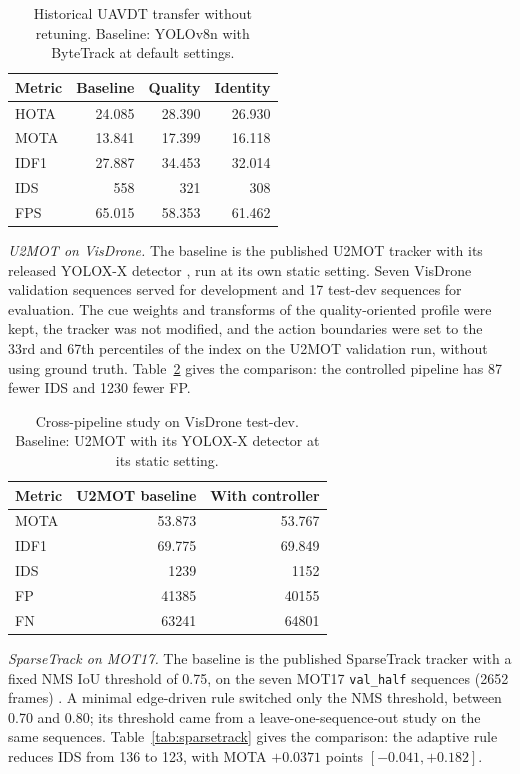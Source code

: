 \begin{table}[t]
\caption{Historical UAVDT transfer without retuning. Baseline: YOLOv8n with
ByteTrack at default settings.}
\label{tab:hist-uavdt}
\centering\footnotesize
\setlength{\tabcolsep}{4pt}
\begin{tabular}{@{}lrrr@{}}
\toprule
Metric & Baseline & Quality & Identity\\
\midrule
HOTA & 24.085 & 28.390 & 26.930\\
MOTA & 13.841 & 17.399 & 16.118\\
IDF1 & 27.887 & 34.453 & 32.014\\
IDS & 558 & 321 & 308\\
FPS & 65.015 & 58.353 & 61.462\\
\bottomrule
\end{tabular}
\end{table}

\emph{U2MOT on VisDrone.} The baseline is the published U2MOT tracker
\cite{liu2023u2mot} with its released YOLOX-X detector \cite{ge2021yolox}, run
at its own static setting. Seven VisDrone validation sequences served for
development and 17 test-dev sequences for evaluation. The cue weights and
transforms of the quality-oriented profile were kept, the tracker was not
modified, and the action boundaries were set to the 33rd and 67th percentiles
of the index on the U2MOT validation run, without using ground truth.
Table~\ref{tab:u2mot} gives the comparison: the controlled pipeline has 87
fewer IDS and 1230 fewer FP.

\begin{table}[t]
\caption{Cross-pipeline study on VisDrone test-dev. Baseline: U2MOT with its
YOLOX-X detector at its static setting.}
\label{tab:u2mot}
\centering\footnotesize
\setlength{\tabcolsep}{4pt}
\begin{tabular}{@{}lrr@{}}
\toprule
Metric & U2MOT baseline & With controller\\
\midrule
MOTA & 53.873 & 53.767\\
IDF1 & 69.775 & 69.849\\
IDS & 1239 & 1152\\
FP & 41385 & 40155\\
FN & 63241 & 64801\\
\bottomrule
\end{tabular}
\end{table}

\emph{SparseTrack on MOT17.} The baseline is the published SparseTrack tracker
\cite{liu2025sparsetrack} with a fixed NMS IoU threshold of 0.75, on the seven
MOT17 \texttt{val\_half} sequences (2652 frames) \cite{milan2020motchallenge}.
A minimal edge-driven rule switched only the NMS threshold, between 0.70 and
0.80; its threshold came from a leave-one-sequence-out study on the same
sequences. Table~\ref{tab:sparsetrack} gives the comparison: the adaptive rule
reduces IDS from 136 to 123, with MOTA $+0.0371$ points $[-0.041, +0.182]$.

